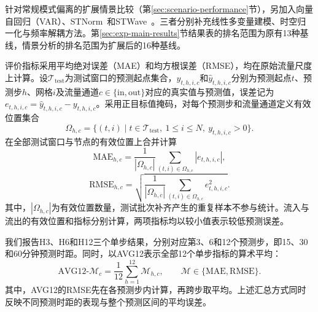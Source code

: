 针对常规模式偏离的扩展情景比较（第\ref{sec:scenario-performance}节），另加入向量自回归（VAR）、STNorm~\cite{ref24}和STWave~\cite{ref11}。三者分别补充线性多变量建模、时空归一化与频率解耦方法。第\ref{sec:exp-main-results}节结果表的排名范围为原有13种基线，情景分析的排名范围为扩展后的16种基线。

评价指标采用平均绝对误差（MAE）和均方根误差（RMSE），均在原始流量尺度上计算。设\(\mathcal{T}_{\mathrm{test}}\)为测试窗口的预测起点集合，\(y_{t,h,i,c}\)和\(\widehat y_{t,h,i,c}\)分别为预测起点\(t\)、预测步\(h\)、网格\(i\)及流量通道\(c\in\{\mathrm{in},\mathrm{out}\}\)对应的真实值与预测值，误差记为\(e_{t,h,i,c}=\widehat y_{t,h,i,c}-y_{t,h,i,c}\)。采用正目标值掩码，对每个预测步和流量通道定义有效位置集合
\[
\Omega_{h,c}=\bigl\{(t,i)\mid t\in\mathcal{T}_{\mathrm{test}},\ 1\leq i\leq N,\ y_{t,h,i,c}>0\bigr\}.
\]
在全部测试窗口与节点的有效位置上合并计算
\begin{equation}
  \label{eq:eval-mae}
  \mathrm{MAE}_{h,c}
  =\frac{1}{|\Omega_{h,c}|}
    \sum_{(t,i)\in\Omega_{h,c}}|e_{t,h,i,c}|,
\end{equation}
\begin{equation}
  \label{eq:eval-rmse}
  \mathrm{RMSE}_{h,c}
  =\sqrt{\frac{1}{|\Omega_{h,c}|}
    \sum_{(t,i)\in\Omega_{h,c}}e_{t,h,i,c}^{2}}.
\end{equation}
其中，\(|\Omega_{h,c}|\)为有效位置数量，测试批次补齐产生的重复样本不参与统计。流入与流出的有效位置和指标分别计算，两项指标均以较小值表示较低预测误差。

我们报告H3、H6和H12三个单步结果，分别对应第3、6和12个预测步，即15、30和60分钟预测时距。同时，以AVG12表示全部12个单步指标的算术平均：
\begin{equation}
  \label{eq:eval-avg12}
  \mathrm{AVG12}\text{-}\mathcal{M}_{c}
  =\frac{1}{12}\sum_{h=1}^{12}\mathcal{M}_{h,c},
  \qquad\mathcal{M}\in\{\mathrm{MAE},\mathrm{RMSE}\}.
\end{equation}
其中，AVG12的RMSE先在各预测步内计算，再跨步取平均。上述汇总方式同时反映不同预测时距的表现与整个预测区间的平均误差。








